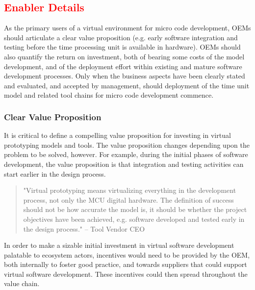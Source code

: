 \subsection{\textcolor{red}{Enabler Details}}
As the primary users of a virtual environment for micro code development, OEMs should articulate a clear value proposition (e.g. early software integration and testing before the time processing unit is available in hardware).
OEMs should also quantify the return on investment, both of bearing some costs of the model development, and of the deployment effort within existing and mature software development processes.
Only when the business aspects have been clearly stated and evaluated, and accepted by management, should deployment of the time unit model and related tool chains for micro code development commence.


\subsubsection*{Clear Value Proposition}
It is critical to define a compelling value proposition for investing in virtual prototyping models and tools.
The value proposition changes depending upon the problem to be solved, however.
For example, during the initial phases of software development,
the value proposition is that
integration and testing activities can start earlier in the design process.

\begin{quote}
"Virtual prototyping means virtualizing everything in the development process, not only the MCU digital hardware.
The definition of success should not be how accurate the model is, it should be whether the project objectives have been achieved, e.g. software developed and tested early in the design process."
-- Tool Vendor CEO
\end{quote}

In order to make a sizable initial investment in virtual software development palatable to ecosystem actors,
incentives would need to be provided by the OEM,
both internally to foster good practice, and towards suppliers that could support virtual software development.
These incentives could then spread throughout the value chain.

